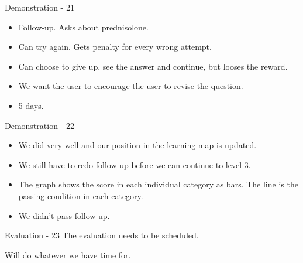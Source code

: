 \documentclass{beamer}
\begin{document}
\begin{frame}{Demonstration - 21}
\begin{itemize}
	\item Follow-up. Asks about prednisolone.
	\item Can try again. Gets penalty for every wrong attempt.
	\item Can choose to give up, see the answer and continue, but looses the reward.
	\item We want the user to encourage the user to revise the question.
	\item 5 days.
\end{itemize}
\end{frame}

\begin{frame}{Demonstration - 22}
\begin{itemize}
	\item We did very well and our position in the learning map is updated.
	\item We still have to redo follow-up before we can continue to level 3.
	\item The graph shows the score in each individual category as bars. The line is the passing condition in each category.
	\item We didn't pass follow-up.
\end{itemize}
\end{frame}

\begin{frame}{Evaluation - 23}
The evaluation needs to be scheduled.

Will do whatever we have time for.
\end{frame}
\end{document}
